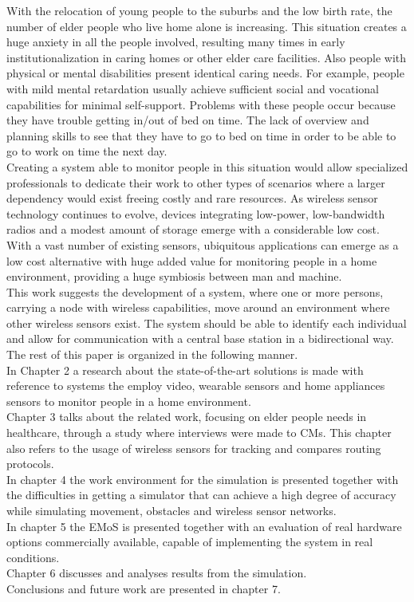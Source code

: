 With the relocation of young people to the suburbs and the low birth rate, the number of elder people who live home alone is increasing. This  situation creates a huge anxiety in all the people involved, resulting many times in early institutionalization in caring homes or other elder care facilities. Also people with physical or mental disabilities present identical caring needs. For example, people with mild mental retardation usually achieve sufficient social and vocational capabilities for minimal self-support. Problems with these people occur because they have trouble getting in/out of bed on time. The lack of overview and planning skills to see that they have to go to bed on time in order to be able to go to work on time the next day.\\
Creating a system able to monitor people in this situation would allow  specialized professionals to dedicate their work to other types of scenarios where a larger dependency would exist freeing costly and rare resources. As wireless sensor technology continues to evolve, devices integrating low-power, low-bandwidth radios and a modest amount of storage emerge with a considerable low cost. With a vast number of existing sensors, ubiquitous applications can emerge as a low cost alternative with huge added value for monitoring people in a home environment, providing a huge symbiosis between man and machine.\\
This work suggests the development of a system, where one or more persons, carrying a node with wireless capabilities, move around an environment where other wireless sensors exist. The system should be able to identify each individual and allow for communication with a central base station in a bidirectional way.\\
The rest of this paper is organized in the following manner.\\In Chapter 2 a research about the state-of-the-art solutions is made with reference to systems the employ video, wearable sensors and home appliances sensors to monitor people in a home environment.\\
Chapter 3 talks about the related work, focusing on elder people needs in healthcare, through a study where interviews were made to \acp{CM}. This chapter also refers to the usage of wireless sensors for tracking and compares routing protocols.\\
In chapter 4 the work environment for the simulation is presented together with the difficulties in getting a simulator that can achieve a high degree of accuracy while simulating movement, obstacles and wireless sensor networks.\\
In chapter 5 the \acf{EMoS} is presented together with an evaluation of real hardware options commercially available, capable of implementing the system in real conditions.\\
Chapter 6 discusses and analyses results from the simulation.\\
Conclusions and future work are presented in chapter 7.




